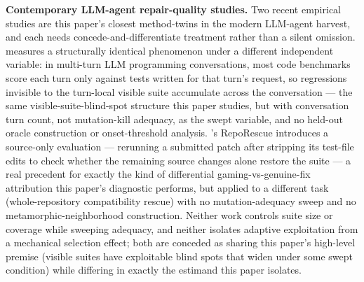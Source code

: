 \documentclass[11pt]{article}
\begin{document}
\textbf{Contemporary LLM-agent repair-quality studies.} Two recent empirical studies are this paper's closest method-twins in the modern LLM-agent harvest, and each needs concede-and-differentiate treatment rather than a silent omission. \citet{2607_01855} measures a structurally identical phenomenon under a different independent variable: in multi-turn LLM programming conversations, most code benchmarks score each turn only against tests written for that turn's request, so regressions invisible to the turn-local visible suite accumulate across the conversation --- the same visible-suite-blind-spot structure this paper studies, but with conversation turn count, not mutation-kill adequacy, as the swept variable, and no held-out oracle construction or onset-threshold analysis. \citet{2607_01213}'s RepoRescue introduces a source-only evaluation --- rerunning a submitted patch after stripping its test-file edits to check whether the remaining source changes alone restore the suite --- a real precedent for exactly the kind of differential gaming-vs-genuine-fix attribution this paper's diagnostic performs, but applied to a different task (whole-repository compatibility rescue) with no mutation-adequacy sweep and no metamorphic-neighborhood construction. Neither work controls suite size or coverage while sweeping adequacy, and neither isolates adaptive exploitation from a mechanical selection effect; both are conceded as sharing this paper's high-level premise (visible suites have exploitable blind spots that widen under some swept condition) while differing in exactly the estimand this paper isolates.
\end{document}
